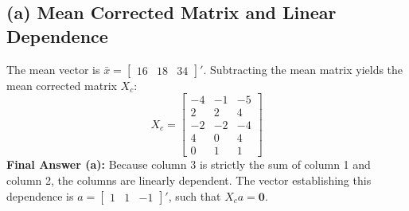 \documentclass[12pt]{article}
\begin{document}
\subsection*{(a) Mean Corrected Matrix and Linear Dependence}
The mean vector is $\bar{x} = \begin{bmatrix} 16 & 18 & 34 \end{bmatrix}'$. Subtracting the mean matrix yields the mean corrected matrix $X_c$:
$$ X_c = \begin{bmatrix} -4 & -1 & -5 \\ 2 & 2 & 4 \\ -2 & -2 & -4 \\ 4 & 0 & 4 \\ 0 & 1 & 1 \end{bmatrix} $$
\textbf{Final Answer (a):} Because column 3 is strictly the sum of column 1 and column 2, the columns are linearly dependent. The vector establishing this dependence is $a = \begin{bmatrix} 1 & 1 & -1 \end{bmatrix}'$, such that $X_c a = \mathbf{0}$.
\end{document}
